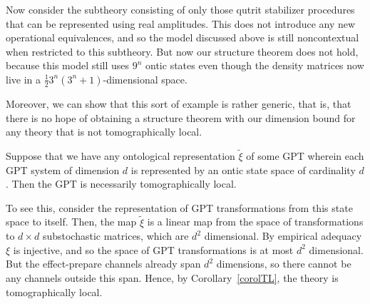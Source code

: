 \documentclass[onecolum,aps,groupedaddress,nofootinbib]{revtex4-2}
\newcommand\Op{\mathsf{Op}}
\begin{document}
Now consider the subtheory consisting of only those qutrit stabilizer procedures that can be represented using real amplitudes. This does not introduce any new operational equivalences, and so the model discussed above is still noncontextual when restricted to this subtheory. But now our structure theorem does not hold, because this model still uses $9^n$ ontic states even though the density matrices now live in a $\frac12 3^n(3^n+1)$-dimensional space.

Moreover, we can show that this sort of example is rather generic, that is, that there is no hope of obtaining a structure theorem with our dimension bound for any theory that is not tomographically local. 

Suppose that we have any ontological representation $\widetilde{\xi}$ of some GPT wherein each GPT system of dimension $d$ is represented by an ontic state space of cardinality $d$. Then the GPT is necessarily tomographically local.

To see this, consider the representation of GPT transformations from this state space to itself. Then, the map $\widetilde{\xi}$ is a linear map from the space of transformations to
$d\times d$ substochastic matrices, which are $d^2$ dimensional. By empirical
adequacy $\xi$ is injective, and so the space of GPT transformations is at most $d^2$
dimensional. But the effect-prepare channels already span $d^2$
dimensions, so there cannot be any channels outside this span. Hence,
by Corollary~\ref{corolTL}, the theory is tomographically local.

\end{document}
